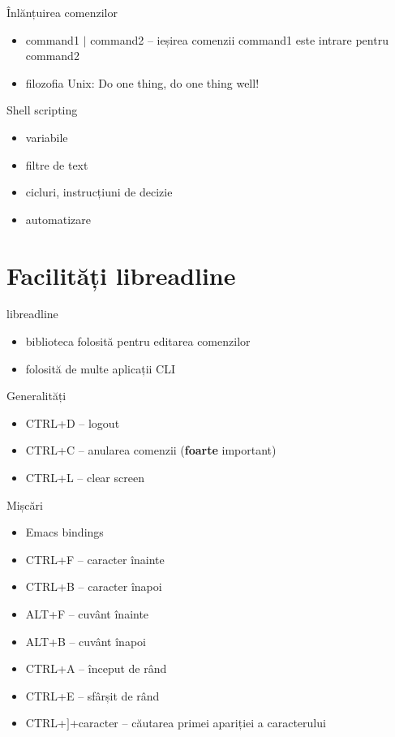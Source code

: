\documentclass{beamer}
\begin{document}
\begin{frame}{Înlănțuirea comenzilor}
	\begin{itemize}
		\item command1 $|$ command2 -- ieșirea comenzii command1 este intrare
		pentru command2
		\item filozofia Unix: Do one thing, do one thing well!
	\end{itemize}
\end{frame}

\begin{frame}{Shell scripting}
	\begin{itemize}
		\item variabile
		\item filtre de text
		\item cicluri, instrucțiuni de decizie
		\item automatizare
	\end{itemize}
\end{frame}

\section{Facilități libreadline}

\begin{frame}{libreadline}
	\begin{itemize}
		\item biblioteca folosită pentru editarea comenzilor
		\item folosită de multe aplicații CLI
	\end{itemize}
\end{frame}

\begin{frame}{Generalități}
	\begin{itemize}
		\item CTRL+D -- logout
		\item CTRL+C -- anularea comenzii (\textbf{foarte} important)
		\item CTRL+L -- clear screen
	\end{itemize}
\end{frame}

\begin{frame}{Mișcări}
	\begin{itemize}
		\item Emacs bindings
		\item CTRL+F -- caracter înainte
		\item CTRL+B -- caracter înapoi
		\item ALT+F -- cuvânt înainte
		\item ALT+B -- cuvânt înapoi
		\item CTRL+A -- început de rând
		\item CTRL+E -- sfârșit de rând
		\item CTRL+$]$+caracter -- căutarea primei apariției a caracterului
	\end{itemize}
\end{frame}
\end{document}
